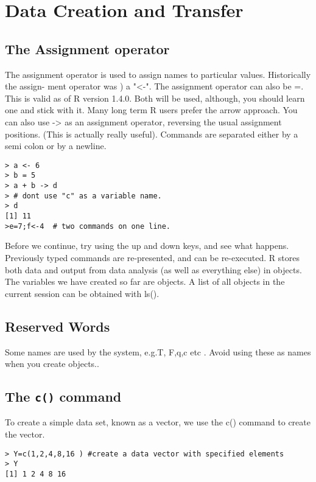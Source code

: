 \documentclass[a4paper,12pt]{article}
\begin{document}
\section{Data Creation and Transfer}

\subsection{The Assignment operator}
The assignment operator is used to assign names to particular values. Historically the assign-
ment operator was ) a "<-". 
The assignment operator can also be =. This is valid as of R
version 1.4.0.
Both will be used, although, you should learn one and stick with it. Many long term R
users prefer the arrow approach. You can also use -> as an assignment operator, reversing the
usual assignment positions. (This is actually really useful). Commands are separated either by
a semi colon or by a newline.
\begin{framed}
\begin{verbatim}
> a <- 6
> b = 5
> a + b -> d
> # dont use "c" as a variable name.
> d
[1] 11
>e=7;f<-4  # two commands on one line.
\end{verbatim}
\end{framed}


Before we continue, try using the up and down keys, and see what happens. Previously
typed commands are re-presented, and can be re-executed.
R stores both data and output from data analysis (as well as everything else) in objects.
The variables we have created so far are objects. A list of all objects in the current session can
be obtained with ls().
\subsection*{Reserved Words}
Some names are used by the system, e.g.T, F,q,c etc . Avoid using these as names when you create objects..

\subsection*{ The \texttt{c()} command}
To create a simple data set, known as a vector, we use the c() command to create the vector.
\begin{verbatim}
> Y=c(1,2,4,8,16 ) #create a data vector with specified elements
> Y
[1] 1 2 4 8 16
\end{verbatim}
\end{document}
